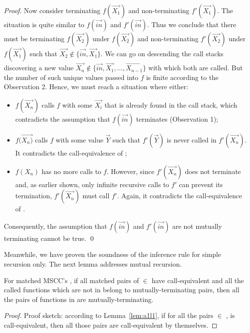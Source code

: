 {\begin{proof}
Now consider terminating $f(\vec{X_1})$ and non-terminating $f'(\vec{X_1})$.
The situation is quite similar to $f(\vec{in})$ and $f'(\vec{in})$. Thus we
conclude that there must be terminating $f(\vec{X_2})$ under $f(\vec{X_2})$ and
non-terminating $f'(\vec{X_2})$ under $f(\vec{X_1})$ such that $\vec{X_2}
\notin \{\vec{in}, \vec{X_1}\}$. We can go on descending the call stacks
discovering a new value $\vec{X_n} \notin \{\vec{in}, \vec{X_1}, ...,
\vec{X_{n-1}}\}$ with which both  are called. But the number of
such unique values passed into $f$ is finite according to the Observation 2. Hence,
we must reach a situation where either:
\begin{itemize}
\item $f(\vec{X_n})$ calls $f$ with some $\vec{X_i}$ that is already found
    in the call stack, which contradicts the assumption that $f(\vec{in})$
    terminates (Observation 1);
\item $f(\vec{X_n)}$ calls $f$ with some value $\vec{Y}$ such that
    $f'(\vec{Y})$ is never called in $f'(\vec{X_n})$. It contradicts the
    call-equivalence of ;
\item $f(X_n)$ has no more calls to $f$. However, since $f'(\vec{X_n})$
    does not terminate and, as earlier shown, only infinite recursive calls
    to $f'$ can prevent its termination, $f'(\vec{X_n})$ must call $f'$.
    Again, it contradicts the call-equivalence of .
\end{itemize}
Consequently, the assumption that $f(\vec{in})$ and $f'(\vec{in})$ are not
mutually terminating cannot be true. \qed \end{proof}

Meanwhile, we have proven the soundness of the inference rule for simple
recursion only. The next lemma addresses mutual recursion.

\begin{lemma}\label{lem:a1l3}
For matched MSCC's , if all matched pairs of  $\in$  have call-equivalent  and all the called functions which are not in  belong to mutually-terminating pairs, then all the pairs of functions in  are mutually-terminating.
\end{lemma}
\begin{proof} Proof sketch: according to Lemma~\ref{lem:a1l1}, if for all the pairs  $\in$
,    is call-equivalent, then all those pairs are
call-equivalent by themselves.


\end{proof}}
